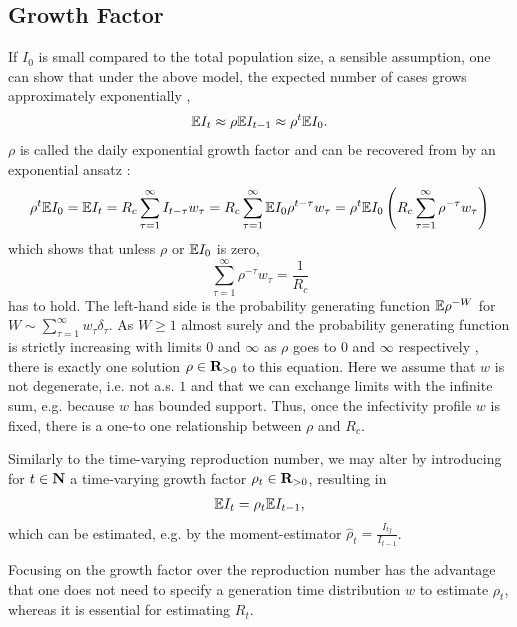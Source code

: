 \subsection{Growth Factor}
\label{subsec:growth_factor}
If $I_{0}$ is small compared to the total population size, a sensible assumption, one can show that under the above model, the expected number of cases grows approximately exponentially \citep[Section 1.2]{Diekmann2013Mathematical}, 
\begin{align}
    \label{eq:exponential-growth}
\mathbb E I_{t} \approx \rho \mathbb E I_{t - 1} \approx \rho^{t} \mathbb E I_{0}.
\end{align}
$\rho$ is called the daily exponential growth factor and can be recovered from  by an exponential ansatz \citep{Wallinga2007How}:
$$
    \rho^{t} \mathbb E I_{0} = \mathbb E I_{t} = R_c \sum_{\tau = 1}^\infty I_{t - \tau}w_{\tau} = R_{c} \sum_{\tau = 1}^\infty \mathbb E I_{0} \rho^{t - \tau} w_{\tau} = \rho^{t} \mathbb E I_{0} \left( R_{c} \sum_{\tau = 1} ^{\infty} \rho^{-\tau}w_{\tau}\right)
$$
which shows that unless $\rho$ or $\mathbb E I_{0}$ is zero, 
$$
    \sum_{\tau = 1}^\infty \rho^{-\tau} w_{\tau} = \frac{1}{R_{c}}
$$
has to hold. The left-hand side is the probability generating function $\mathbb E \rho^{-W}$ for $W \sim \sum_{\tau = 1}^\infty w_{\tau}\delta_{\tau}$. As $W \geq 1$ almost surely and the probability generating function is strictly increasing with limits $0$ and $\infty$ as $\rho$ goes to $0$ and $\infty$ respectively , there is exactly one solution $\rho \in \mathbf R_{> 0}$ to this equation. Here we assume that $w$ is not degenerate, i.e. not a.s. $1$ and  that we can exchange limits with the infinite sum, e.g. because $w$ has bounded support. Thus, once the infectivity profile $w$ is fixed, there is a one-to one relationship between $\rho$ and $R_{c}$. 

Similarly to the time-varying reproduction number, we may alter  by introducing for $t \in \mathbf N$ a time-varying growth factor $\rho_{t} \in \mathbf R_{> 0}$, resulting in 
\begin{align}
    \label{eq:exponential-growth-time-varying}
    \mathbb E I_{t} = \rho_t \mathbb E I_{t - 1},
\end{align}
which can be estimated, e.g. by the moment-estimator $\hat \rho_{t} = \frac{I_{tj}}{I_{t - 1}}$. 

Focusing on the growth factor over the reproduction number has the advantage that one does not need to specify a generation time distribution $w$ to estimate $\rho_{t}$, whereas it is essential for estimating $R_{t}$. 

